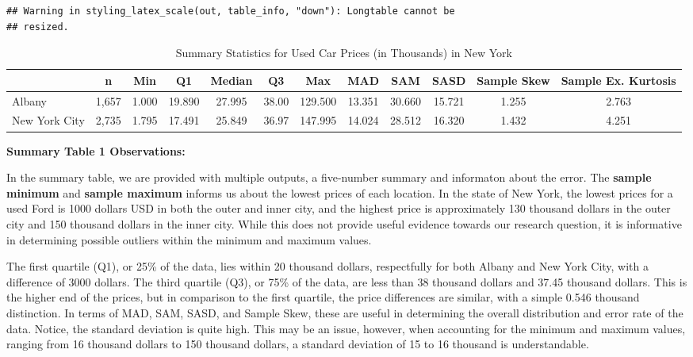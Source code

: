 \documentclass[
]{article}
\begin{document}
\begin{verbatim}
## Warning in styling_latex_scale(out, table_info, "down"): Longtable cannot be
## resized.
\end{verbatim}

\begingroup\fontsize{12}{14}\selectfont

\begin{longtable}[t]{lccccccccccc}
\caption{\label{tab:unnamed-chunk-11}Summary Statistics for Used Car Prices (in Thousands) in New York}\\
\toprule
 & n & Min & Q1 & Median & Q3 & Max & MAD & SAM & SASD & Sample Skew & Sample Ex. Kurtosis\\
\midrule
Albany & 1,657 & 1.000 & 19.890 & 27.995 & 38.00 & 129.500 & 13.351 & 30.660 & 15.721 & 1.255 & 2.763\\
New York City & 2,735 & 1.795 & 17.491 & 25.849 & 36.97 & 147.995 & 14.024 & 28.512 & 16.320 & 1.432 & 4.251\\
\bottomrule
\end{longtable}
\endgroup{}

\textbf{Summary Table 1 Observations:}

In the summary table, we are provided with multiple outputs, a
five-number summary and informaton about the error. The \textbf{sample
minimum} and \textbf{sample maximum} informs us about the lowest prices
of each location. In the state of New York, the lowest prices for a used
Ford is 1000 dollars USD in both the outer and inner city, and the
highest price is approximately 130 thousand dollars in the outer city
and 150 thousand dollars in the inner city. While this does not provide
useful evidence towards our research question, it is informative in
determining possible outliers within the minimum and maximum values.

The first quartile (Q1), or 25\% of the data, lies within 20 thousand
dollars, respectfully for both Albany and New York City, with a
difference of 3000 dollars. The third quartile (Q3), or 75\% of the
data, are less than 38 thousand dollars and 37.45 thousand dollars. This
is the higher end of the prices, but in comparison to the first
quartile, the price differences are similar, with a simple 0.546
thousand distinction. In terms of MAD, SAM, SASD, and Sample Skew, these
are useful in determining the overall distribution and error rate of the
data. Notice, the standard deviation is quite high. This may be an
issue, however, when accounting for the minimum and maximum values,
ranging from 16 thousand dollars to 150 thousand dollars, a standard
deviation of 15 to 16 thousand is understandable.
\end{document}
